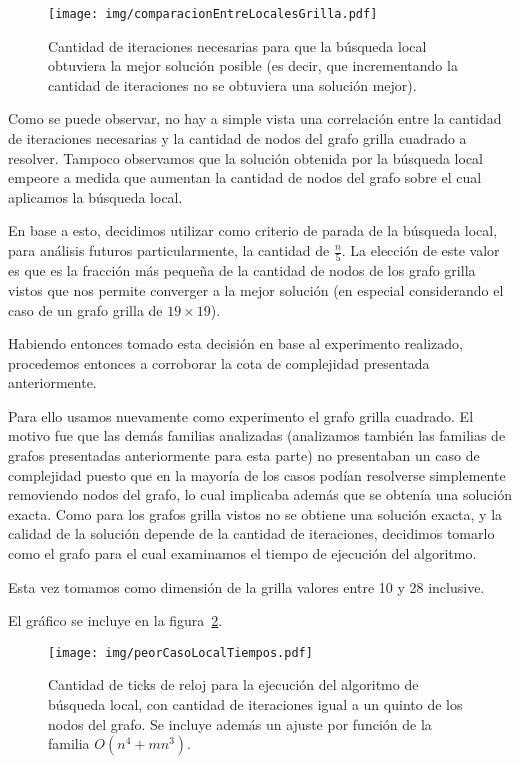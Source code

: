 \begin{figure}[H]
	\caption{Cantidad de iteraciones necesarias para que la b\'usqueda
	local obtuviera la mejor soluci\'on posible (es decir, que 
	incrementando la cantidad de iteraciones no se obtuviera una 
	soluci\'on mejor).}
	\label{fig::comparacionEntreLocalesGrilla}
	\centering
	\texttt{[image: img/comparacionEntreLocalesGrilla.pdf]}
\end{figure}

Como se puede observar, no hay a simple vista una correlaci\'on entre la 
cantidad de iteraciones necesarias y la cantidad de nodos del grafo grilla
cuadrado a resolver. Tampoco observamos que la soluci\'on obtenida por la 
b\'usqueda local empeore a medida que aumentan la cantidad de nodos del
grafo sobre el cual aplicamos la b\'usqueda local.

En base a esto, decidimos utilizar como criterio de parada de la 
b\'usqueda local, para an\'alisis futuros particularmente, la cantidad
de $\frac{n}{5}$. La elecci\'on de este valor es que es la fracci\'on
m\'as peque\~na de la cantidad de nodos de los grafo grilla vistos que
nos permite converger a la mejor soluci\'on (en especial considerando el
caso de un grafo grilla de $19 \times 19$).

Habiendo entonces tomado esta decisi\'on en base al experimento 
realizado, procedemos entonces a corroborar la cota de complejidad 
presentada anteriormente.

Para ello usamos nuevamente como experimento el grafo grilla cuadrado.
El motivo fue que las dem\'as familias analizadas (analizamos 
tambi\'en las familias de grafos presentadas anteriormente para esta
parte) no presentaban un caso de complejidad puesto que en la mayor\'ia
de los casos pod\'ian resolverse simplemente removiendo nodos del grafo,
lo cual implicaba adem\'as que se obten\'ia una soluci\'on exacta. Como
para los grafos grilla vistos no se obtiene una soluci\'on exacta, y la
calidad de la soluci\'on depende de la cantidad de iteraciones, 
decidimos tomarlo como el grafo para el cual examinamos el tiempo de
ejecuci\'on del algoritmo.

Esta vez tomamos como dimensi\'on de la grilla valores entre 10 y 28 
inclusive.

El gr\'afico se incluye en la figura~\ref{fig::peorCasoLocalTiempos}.

\begin{figure}[H]
	\caption{Cantidad de ticks de reloj para la ejecuci\'on del 
	algoritmo de b\'usqueda local, con cantidad de iteraciones igual
	a un quinto de los nodos del grafo. Se incluye adem\'as un ajuste
	por funci\'on de la familia $O(n^4 + m n^3)$.}
	\label{fig::peorCasoLocalTiempos}
	\centering
	\texttt{[image: img/peorCasoLocalTiempos.pdf]}
\end{figure}

